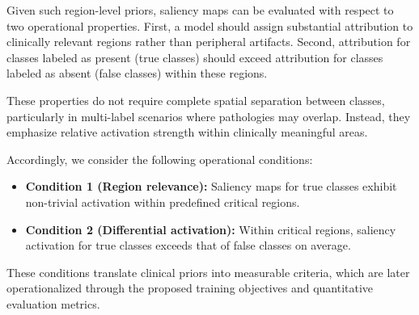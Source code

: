 \documentclass[preprint,7pt, a4paper]{elsarticle}
\begin{document}
Given such region-level priors, saliency maps can be evaluated with respect to two operational properties. First, a model should assign substantial attribution to clinically relevant regions rather than peripheral artifacts. Second, attribution for classes labeled as present (true classes) should exceed attribution for classes labeled as absent (false classes) within these regions.

These properties do not require complete spatial separation between classes, particularly in multi-label scenarios where pathologies may overlap. Instead, they emphasize relative activation strength within clinically meaningful areas.

Accordingly, we consider the following operational conditions:

\begin{itemize}
    \item \textbf{Condition 1 (Region relevance):} Saliency maps for true classes exhibit non-trivial activation within predefined critical regions.
    \item \textbf{Condition 2 (Differential activation):} Within critical regions, saliency activation for true classes exceeds that of false classes on average.
\end{itemize}

These conditions translate clinical priors into measurable criteria, which are later operationalized through the proposed training objectives and quantitative evaluation metrics.



\end{document}
